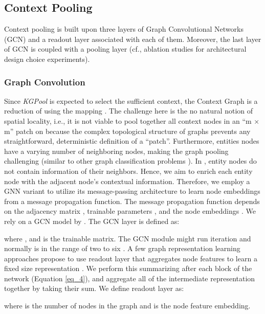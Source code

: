 \documentclass[11pt,a4paper]{article}
\begin{document}
\subsection{Context Pooling} \label{sec:context_pooling}
Context pooling is built upon three layers of Graph Convolutional Networks (GCN)
and a readout layer associated with each of them. Moreover, the last layer of GCN is coupled with a pooling layer (cf., ablation studies for architectural design choice experiments).
\subsubsection{Graph Convolution}\label{sec:graph_convolution}
Since \textit{KGPool} is expected to select the sufficient context, the Context Graph  is a reduction of  using the mapping .  
The challenge here is the no natural notion of spatial locality, i.e., it is not viable to pool together all context nodes in an “m × m” patch on  because the complex topological structure of graphs prevents any straightforward,
deterministic definition of a “patch”. Furthermore,
entities nodes have a varying number of neighboring nodes, making the graph pooling challenging (similar to other graph classification problems \cite{ying2018hierarchical}).
In , entity nodes do not contain information of their neighbors. Hence, we aim to enrich each entity node with the adjacent node's contextual information. 
Therefore, we employ a GNN variant to utilize its message-passing architecture to learn node embeddings from a message propagation function. 
The message propagation function depends on the adjacency matrix , trainable parameters , and the node embeddings  \cite{ying2018hierarchical}. We rely on a GCN model by \citet{kipf2016semi}. The GCN layer is defined as:  
 
where ,  and  is the trainable matrix. The GCN module might run 
 iteration and normally is in the range of two to six \cite{ying2018hierarchical}. 
A few graph representation learning approaches propose to use readout layer that aggregates node features to learn a fixed size representation \cite{xu2018representation,cangea2018towards}. We perform this summarizing after each block of the network (Equation \ref{eq_4}), and aggregate all of the intermediate representation together by taking their sum. We define readout layer  as:
 
where  is the number of nodes in the graph and  is the node feature embedding. 
\end{document}
